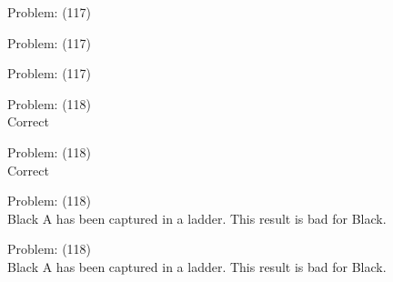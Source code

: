 \documentclass[11pt]{article}
\begin{document}
\begin{minipage}[t]{0.5\textwidth}
  {\centering
  
  Problem: (117)\\
  
  }
\end{minipage}
\begin{minipage}[t]{0.5\textwidth}
  {\centering
  
  Problem: (117)\\
  
  }
\end{minipage}
\begin{minipage}[t]{0.5\textwidth}
  {\centering
  
  Problem: (117)\\
  
  }
\end{minipage}
\begin{minipage}[t]{0.5\textwidth}
  {\centering
  
  Problem: (118)\\
  Correct\\
  }
\end{minipage}
\begin{minipage}[t]{0.5\textwidth}
  {\centering
  
  Problem: (118)\\
  Correct\\
  }
\end{minipage}
\begin{minipage}[t]{0.5\textwidth}
  {\centering
  
  Problem: (118)\\
  Black A has been captured in a ladder. This result is bad for Black.\\
  }
\end{minipage}
\begin{minipage}[t]{0.5\textwidth}
  {\centering
  
  Problem: (118)\\
  Black A has been captured in a ladder. This result is bad for Black.\\
  }
\end{minipage}
\end{document}
